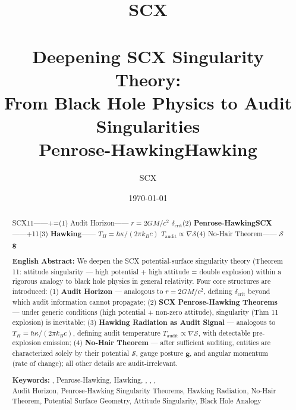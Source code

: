 \documentclass[12pt,a4paper]{article}
\title{\textbf{SCX\\
}\\[8pt]
\large Deepening SCX Singularity Theory: \\
From Black Hole Physics to Audit Singularities\\[8pt]
\large Penrose-HawkingHawking}
\author{SCX}
\date{\today}
\theoremstyle{remark}
\newcommand{\g}{\mathbf{g}}
\begin{document}
\maketitle

\begin{abstract}
\noindent
\textbf{} SCX11——+=(1) \textbf{}Audit Horizon—— $r=2GM/c^2$ $\delta_{\mathrm{crit}}$(2) \textbf{Penrose-HawkingSCX}——+11(3) \textbf{Hawking}—— $T_H = \hbar\kappa/(2\pi k_B c)$ $T_{\mathrm{audit}} \propto \nabla\mathcal{S}$(4) \textbf{}No-Hair Theorem—— $\mathcal{S}$ $\g$

\vspace{6pt}
\noindent
\textbf{English Abstract:} We deepen the SCX potential-surface singularity theory (Theorem 11: attitude singularity — high potential + high attitude = double explosion) within a rigorous analogy to black hole physics in general relativity. Four core structures are introduced: (1) \textbf{Audit Horizon} — analogous to $r=2GM/c^2$, defining $\delta_{\mathrm{crit}}$ beyond which audit information cannot propagate; (2) \textbf{SCX Penrose-Hawking Theorems} — under generic conditions (high potential + non-zero attitude), singularity (Thm 11 explosion) is inevitable; (3) \textbf{Hawking Radiation as Audit Signal} — analogous to $T_H=\hbar\kappa/(2\pi k_B c)$, defining audit temperature $T_{\mathrm{audit}}\propto\nabla\mathcal{S}$, with detectable pre-explosion emission; (4) \textbf{No-Hair Theorem} — after sufficient auditing, entities are characterized solely by their potential $\mathcal{S}$, gauge posture $\g$, and angular momentum (rate of change); all other details are audit-irrelevant.

\vspace{6pt}
\noindent
\textbf{Keywords:} , Penrose-Hawking, Hawking, , , ,  \\[4pt]
Audit Horizon, Penrose-Hawking Singularity Theorems, Hawking Radiation, No-Hair Theorem, Potential Surface Geometry, Attitude Singularity, Black Hole Analogy
\end{abstract}

\newpage
\tableofcontents
\newpage
\end{document}
